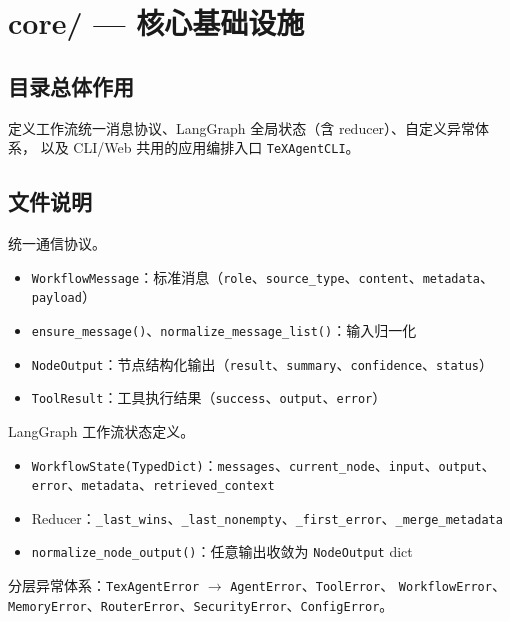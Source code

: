 \section{core/ — 核心基础设施}

\subsection{目录总体作用}

定义工作流统一消息协议、LangGraph 全局状态（含 reducer）、自定义异常体系，
以及 CLI/Web 共用的应用编排入口 \texttt{TeXAgentCLI}。

\subsection{文件说明}

\begin{description}[leftmargin=4em,style=nextline]
    \item[\texttt{message.py}]
    统一通信协议。
    \begin{itemize}
        \item \texttt{WorkflowMessage}：标准消息（\texttt{role}、\texttt{source\_type}、\texttt{content}、\texttt{metadata}、\texttt{payload}）
        \item \texttt{ensure\_message()}、\texttt{normalize\_message\_list()}：输入归一化
        \item \texttt{NodeOutput}：节点结构化输出（\texttt{result}、\texttt{summary}、\texttt{confidence}、\texttt{status}）
        \item \texttt{ToolResult}：工具执行结果（\texttt{success}、\texttt{output}、\texttt{error}）
    \end{itemize}

    \item[\texttt{state.py}]
    LangGraph 工作流状态定义。
    \begin{itemize}
        \item \texttt{WorkflowState(TypedDict)}：\texttt{messages}、\texttt{current\_node}、\texttt{input}、\texttt{output}、\texttt{error}、\texttt{metadata}、\texttt{retrieved\_context}
        \item Reducer：\texttt{\_last\_wins}、\texttt{\_last\_nonempty}、\texttt{\_first\_error}、\texttt{\_merge\_metadata}
        \item \texttt{normalize\_node\_output()}：任意输出收敛为 \texttt{NodeOutput} dict
    \end{itemize}

    \item[\texttt{exceptions.py}]
    分层异常体系：\texttt{TexAgentError} $\rightarrow$ \texttt{AgentError}、\texttt{ToolError}、
    \texttt{WorkflowError}、\texttt{MemoryError}、\texttt{RouterError}、\texttt{SecurityError}、\texttt{ConfigError}。


\end{description}
